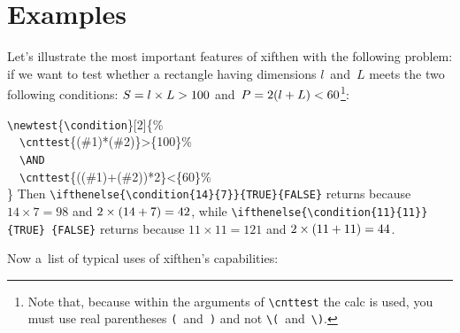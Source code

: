 \documentclass{article}
\makeatletter
\newcommand*{\cmd}[1]{\tex{\textbackslash #1}}
\newcommand*{\tex}{\texttt}
\newenvironment*{texcode}{\list{}{}\item\ttfamily}{\endlist}
\newcommand*{\1}{$_1\m@th$}
\newcommand*{\2}{$_2\m@th$}
\newcommand*{\pack}{\textsf}
\makeatother
\begin{document}
\section{Examples}

Let's illustrate the most important features of \pack{xifthen} with
the following problem: if we want to test whether a rectangle having
dimensions $l$~and~$L$ meets the two following conditions: $S = l
\times\nobreak L > 100$ and~$P = 2 (l +\nobreak L) < 60$\footnote{Note
  that, because within the arguments of \cmd{cnttest} the \pack{calc}
  is used, you must use real parentheses \tex{(}~and~\tex{)} and not
  \cmd{(}~and~\cmd{)}.}:
%
\begin{texcode}
\cmd{newtest}\{\cmd{condition}\}[2]\{\%\\
\mbox{}\ \ \cmd{cnttest}\{(\#1)*(\#2)\}>\{100\}\%\\
\mbox{}\ \ \cmd{AND}\\
\mbox{}\ \ \cmd{cnttest}\{((\#1)+(\#2))*2\}<\{60\}\%\\
\}
\end{texcode}
%
Then \tex{\cmd{ifthenelse}\{\cmd{condition}\{14\}\{7\}\}\{TRUE\}\{FALSE\}}
returns  because $14\times 7 =
98$ and $2\times (14 +\nobreak 7) = 42$, while
\tex{\cmd{ifthenelse}\{\cmd{condition}\{11\}\{11\}\}\{TRUE\}\allowbreak
  \{FALSE\}} returns  because
$11 \times 11 = 121$ and $2\times (11 +\nobreak 11) = 44$.

\bigbreak

Now a~list of typical uses of \pack{xifthen}'s capabilities:
\end{document}
